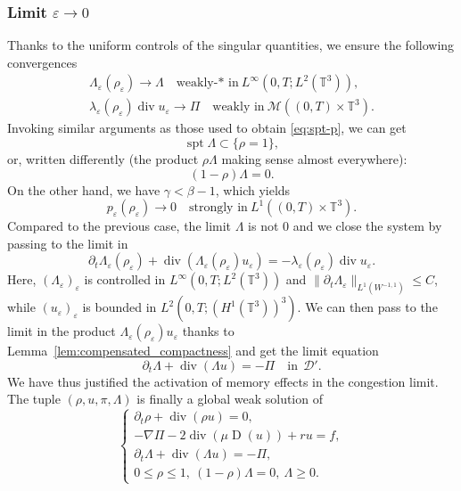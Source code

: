 \documentclass[10pt]{amsart}
\let\mathcal\mathscr
\newcommand{\<}{\bigl\langle}
\renewcommand{\>}{\bigr\rangle}
\DeclareMathOperator{\spt}{spt}
\newcommand{\labeleq}[1]{}
\newenvironment{subnumcasess}{\begin{equation*}\begin{cases}}{\end{cases}\end{equation*}}
\theoremstyle{definition}
\theoremstyle{remark}
\newcommand{\TT}{\mathbb{T}^3}
\DeclareMathOperator{\Div}{div}
\DeclareMathOperator{\D}{D}
\let\ep\varepsilon
\begin{document}
\subsubsection{Limit $\ep \rightarrow 0$}
Thanks to the uniform controls of the singular quantities, we ensure the following convergences
\begin{gather*}
\Lambda_\ep(\rho_\ep) \to \Lambda \quad \text{weakly-* in} ~ L^\infty(0,T;L^2(\TT)),\\
\lambda_\ep(\rho_\ep) \Div u_\ep \to \Pi \quad \text{weakly in} ~
\mathcal{M}((0,T)\times \TT).
\end{gather*}
Invoking similar arguments as those used to obtain \eqref{eq:spt-p}, we can get
\[
\spt \Lambda \subset \{ \rho = 1\},
\]
or, written differently (the product $\rho \Lambda$ making sense almost everywhere):
\[
(1-\rho) \Lambda = 0.
\]
On the other hand, we have $\gamma < \beta-1$, which yields
\begin{equation*}
p_\ep(\rho_\ep) \to 0 \quad\text{strongly in} ~ L^1((0,T)\times \TT).
\end{equation*}
Compared to the previous case, the limit $\Lambda$ is not $0$ and we close the system by passing to the limit in
\[
\partial_t \Lambda_\ep(\rho_\ep) + \Div(\Lambda_\ep(\rho_\ep) u_\ep) = - \lambda_\ep(\rho_\ep)\Div u_\ep.
\]
Here, $(\Lambda_\ep)_\ep$ is controlled in $L^\infty(0,T; L^2(\TT))$ and $\|\partial_t \Lambda_\ep\|_{L^1(W^{-1,1})}\leq C$, while $(u_\ep)_\ep$ is bounded in $L^2(0,T;(H^1(\TT))^3)$.
We can then pass to the limit in the product $\Lambda_\ep(\rho_\ep) u_\ep$ thanks to Lemma~\ref{lem:compensated_compactness} and get the limit equation
\[
\partial_t \Lambda + \Div(\Lambda u) = -\Pi \quad \text{in} ~ ~\mathcal{D}'.
\]
We have thus justified the activation of memory effects in the congestion limit.
The tuple $(\rho, u, \pi,\Lambda)$ is finally a global weak solution of
\begin{subnumcasess}{\labeleq{xxx}}
\partial_t \rho + \Div (\rho u) = 0, \\
-\nabla \Pi - 2 \Div(\mu \D(u)) + r u = f, \\
\partial_t \Lambda + \Div(\Lambda u) = -\Pi,\\
0 \leq \rho \leq 1, ~(1-\rho)\Lambda = 0,~ \Lambda \geq 0.
\end{subnumcasess}%
\end{document}
